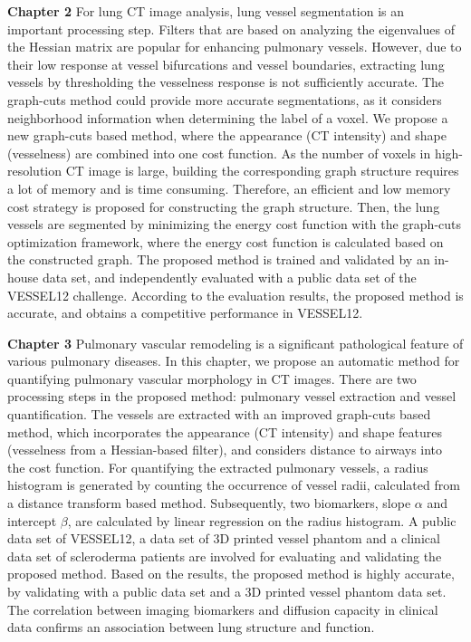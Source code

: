 \textbf{Chapter 2} For lung CT image analysis, lung vessel segmentation is an important processing step. Filters that are based on analyzing the eigenvalues of the Hessian matrix are popular for enhancing pulmonary vessels. However, due to their low response at vessel bifurcations and vessel boundaries, extracting lung vessels by thresholding the vesselness response is not sufficiently accurate. The graph-cuts method could provide more accurate segmentations, as it considers neighborhood information when determining the label of a voxel. We propose a new graph-cuts based method, where the appearance (CT intensity) and shape (vesselness) are combined into one cost function. As the number of voxels in high-resolution CT image is large, building the corresponding graph structure requires a lot of memory and is time consuming. Therefore, an efficient and low memory cost strategy is proposed for constructing the graph structure. Then, the lung vessels are segmented by minimizing the energy cost function with the graph-cuts optimization framework, where the energy cost function is calculated based on the constructed graph. The proposed method is trained and validated by an in-house data set, and independently evaluated with a public data set of the VESSEL12 challenge. According to the evaluation results, the proposed method is accurate, and obtains a competitive performance in VESSEL12.         

\textbf{Chapter 3} Pulmonary vascular remodeling is a significant pathological feature of various pulmonary diseases. In this chapter, we propose an automatic method for quantifying pulmonary vascular morphology in CT images. There are two processing steps in the proposed method: pulmonary vessel extraction and vessel quantification. The vessels are extracted with an improved graph-cuts based method, which incorporates the appearance (CT intensity) and shape features (vesselness from a Hessian-based filter), and considers distance to airways into the cost function. For quantifying the extracted pulmonary vessels, a radius histogram is generated by counting the occurrence of vessel radii, calculated from a distance transform based method. Subsequently, two biomarkers, slope $\alpha$ and intercept $\beta$, are calculated by linear regression on the radius histogram. A public data set of VESSEL12, a data set of 3D printed vessel phantom and a clinical data set of scleroderma patients are involved for evaluating and validating the proposed method. Based on the results, the proposed method is highly accurate, by validating with a public data set and a 3D printed vessel phantom data set. The correlation between imaging biomarkers and diffusion capacity in clinical data confirms an association between lung structure and function.

